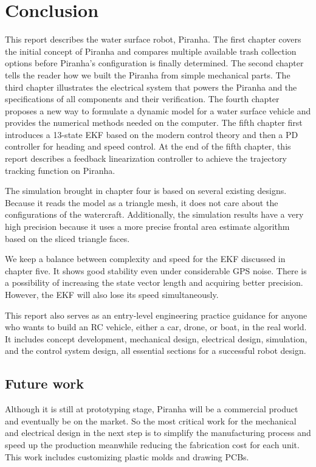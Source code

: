 \chapter{Conclusion}

This report describes the water surface robot, Piranha. The first chapter covers the initial concept of Piranha and compares multiple available trash collection options before Piranha's configuration is finally determined. The second chapter tells the reader how we built the Piranha from simple mechanical parts. The third chapter illustrates the electrical system that powers the Piranha and the specifications of all components and their verification. The fourth chapter proposes a new way to formulate a dynamic model for a water surface vehicle and provides the numerical methods needed on the computer.  The fifth chapter first introduces a 13-state EKF based on the modern control theory and then a PD controller for heading and speed control. At the end of the fifth chapter, this report describes a feedback linearization controller to achieve the trajectory tracking function on Piranha.

The simulation brought in chapter four is based on several existing designs. Because it reads the model as a triangle mesh, it does not care about the configurations of the watercraft. Additionally, the simulation results have a very high precision because it uses a more precise frontal area estimate algorithm based on the sliced triangle faces. 

We keep a balance between complexity and speed for the EKF discussed in chapter five. It shows good stability even under considerable GPS noise. There is a possibility of increasing the state vector length and acquiring better precision. However, the EKF will also lose its speed simultaneously.

This report also serves as an entry-level engineering practice guidance for anyone who wants to build an RC vehicle, either a car, drone, or boat, in the real world. It includes concept development, mechanical design, electrical design, simulation, and the control system design, all essential sections for a successful robot design.

\section{Future work}

Although it is still at prototyping stage, Piranha will be a commercial product and eventually be on the market. So the most critical work for the mechanical and electrical design in the next step is to simplify the manufacturing process and speed up the production meanwhile reducing the fabrication cost for each unit. This work includes customizing plastic molds and drawing PCBs.

